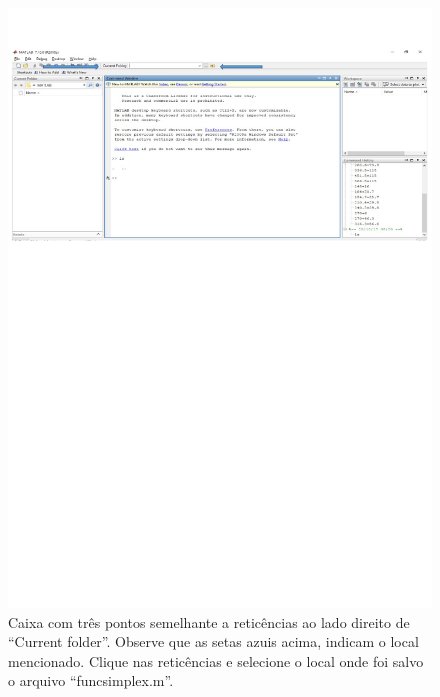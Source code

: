 \documentclass[10pt]{article}
\begin{document}
\begin{figure}[H]
    \centering
    \includegraphics[scale = 0.65]{fig1teste11.pdf}
    \caption{Caixa com três pontos semelhante a reticências ao lado direito de ``Current folder''. Observe que as setas azuis acima, indicam o local mencionado. Clique nas reticências e selecione o local onde foi salvo o arquivo ``funcsimplex.m''.}
\end{figure}
\end{document}

